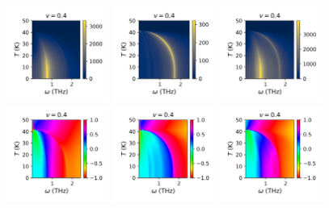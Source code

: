 \documentclass[a4paper]{article}
\begin{document}
\begin{figure}[H]
  \centering
  \includegraphics[width=0.3\textwidth]{v4-g1_abs.png}
  \includegraphics[width=0.3\textwidth]{v4-g2_abs.png}
  \includegraphics[width=0.3\textwidth]{v4-g3_abs.png}
  \includegraphics[width=0.3\textwidth]{v4-g1_phase.png}
  \includegraphics[width=0.3\textwidth]{v4-g2_phase.png}
  \includegraphics[width=0.3\textwidth]{v4-g3_phase.png}
\end{figure}
\end{document}
